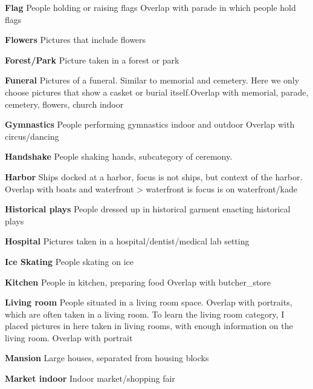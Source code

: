 
\noindent\textbf{Flag}
People holding or raising flags
Overlap with parade in which people hold flags

\noindent\textbf{Flowers}
Pictures that include flowers

\noindent\textbf{Forest/Park}
Picture taken in a forest or park


\noindent\textbf{Funeral}
Pictures of a funeral. Similar to memorial and cemetery. Here we only choose pictures that show a casket or burial itself.Overlap with memorial, parade, cemetery, flowers, church indoor

%

\noindent\textbf{Gymnastics}
People performing gymnastics indoor and outdoor
Overlap with circus/dancing

\noindent\textbf{Handshake}
People shaking hands, subcategory of ceremony. 

\noindent\textbf{Harbor}
Ships docked at a harbor, focus is not ships, but context of the harbor. 
Overlap with boats and waterfront > waterfront is focus is on waterfront/kade

\noindent\textbf{Historical plays}
People dressed up in historical garment enacting historical plays


\noindent\textbf{Hospital}
Pictures taken in a hospital/dentist/medical lab setting


\noindent\textbf{Ice Skating}
People skating on ice

\noindent\textbf{Kitchen}
People in kitchen, preparing food
Overlap with butcher\_store

%
%

\noindent\textbf{Living room}
People situated in a living room space.
Overlap with portraits, which are often taken in a living room. To learn the living room category, I placed pictures in here taken in living rooms, with enough information on the living room. Overlap with portrait

\noindent\textbf{Mansion}
Large houses, separated from housing blocks

\noindent\textbf{Market indoor}
Indoor market/shopping fair

